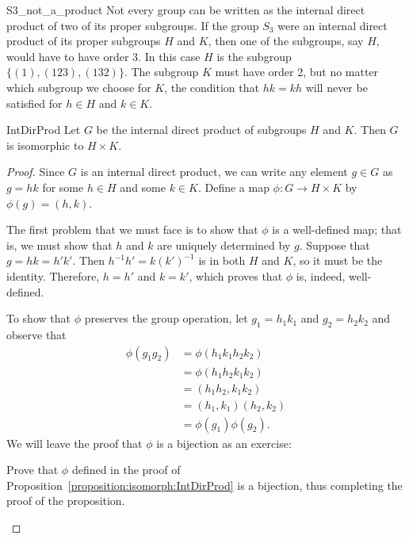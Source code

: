  
\begin{example}{S3_not_a_product}
Not every group can be written as the internal direct product of two
of its proper subgroups.  If the group $S_3$ were an internal direct
product of its proper subgroups $H$ and $K$, then one of the  subgroups,
say $H$, would have to have order 3. In this case $H$ is the subgroup $\{
(1), (123), (132) \}$. The subgroup $K$ must have order 2, but no
matter which subgroup we choose for $K$, the condition that $hk = kh$
will never be satisfied for $h \in H$ and $k \in K$.
\end{example}

 
\begin{prop}{IntDirProd}
Let $G$ be the internal direct product of  subgroups $H$ and $K$. Then
$G$ is isomorphic to $H \times K$. 
\end{prop}
 

\begin{proof}
Since $G$ is an internal direct product, we can write any element $g
\in G$ as $g =hk$ for some $h \in H$ and some $k \in K$. Define a map
$\phi : G \rightarrow H \times K$ by $\phi(g) = (h,k)$.

 
The first problem that we must face is to show that $\phi$ is a
well-defined map; that is, we must show that $h$ and $k$ are uniquely
determined by $g$. Suppose that $g = hk=h'k'$. Then $h^{-1} h'= k
(k')^{-1}$ is in both $H$ and $K$, so it must be the identity.
Therefore, $h = h'$ and $k = k'$, which proves that $\phi$ is, indeed,
well-defined. 

 
To show that $\phi$ preserves the group operation, let $g_1 = h_1 k_1$
and $g_2 = h_2 k_2$ and observe that 
\begin{align*}
\phi( g_1 g_2 ) & = \phi( h_1 k_1 h_2 k_2 )\\
& = \phi(h_1  h_2 k_1 k_2) \\
& = (h_1  h_2, k_1 k_2) \\
& = (h_1, k_1)( h_2, k_2) \\
& = \phi( g_1 ) \phi(  g_2 ).
\end{align*}
We will leave the proof that $\phi$ is a bijection as an exercise:

\begin{exercise}{}
Prove that  $\phi$ defined in the proof of Proposition~\ref{proposition:isomorph:IntDirProd} is a bijection, thus completing the proof of the proposition.
 \end{exercise}


\end{proof}

